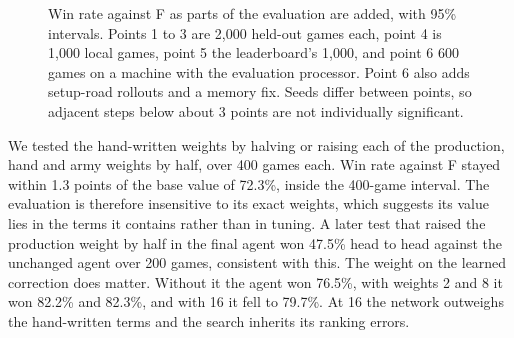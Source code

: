 \documentclass[11pt,a4paper]{article}
\begin{document}
\begin{figure}[h]\centering
{}
\caption{Win rate against F as parts of the evaluation are added, with 95\% intervals. Points 1 to 3 are 2,000
held-out games each, point 4 is 1,000 local games, point 5 the leaderboard's 1,000, and point 6 600 games on a
machine with the evaluation processor. Point 6 also adds setup-road rollouts and a memory fix. Seeds differ between
points, so adjacent steps below about 3 points are not individually significant.}\label{fig:ladder}
\end{figure}

We tested the hand-written weights by halving or raising each of the production, hand and army weights by half,
over 400 games each. Win rate against F stayed within 1.3 points of the base value of 72.3\%, inside the 400-game
interval. The evaluation is therefore insensitive to its
exact weights, which suggests its value lies in the terms it contains rather than in tuning. A later test that raised
the production weight by half in the final agent won 47.5\% head to head against the unchanged agent over 200 games,
consistent with this. The weight on the learned correction does matter. Without it the agent won 76.5\%, with
weights 2 and 8 it won 82.2\% and 82.3\%, and with 16 it fell to 79.7\%. At 16 the network outweighs the
hand-written terms and the search inherits its ranking errors.
\end{document}
